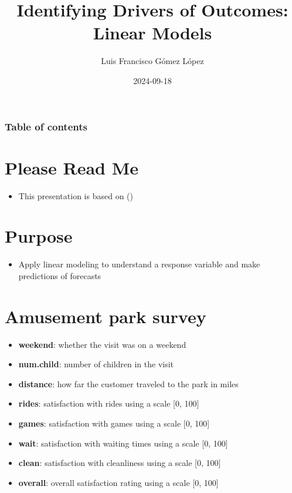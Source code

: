 \documentclass[
  ignorenonframetext,
]{beamer}
\title{Identifying Drivers of Outcomes: Linear Models}
\author{Luis Francisco Gómez López}
\date{2024-09-18}
\institute{FAEDIS}
\providecommand{\tightlist}{%
  \setlength{\itemsep}{0pt}\setlength{\parskip}{0pt}}\usepackage{longtable,booktabs,array}
\renewcommand*\contentsname{Table of contents}
\newcommand\contentsname{Table of contents}
\begin{document}
\frame{\titlepage}

\renewcommand*\contentsname{Table of contents}
\begin{frame}[allowframebreaks]
  \frametitle{Table of contents}
  \tableofcontents[hideallsubsections]
\end{frame}

\section{Please Read Me}\label{please-read-me}

\begin{frame}{}
\label{section}
\begin{itemize}
\tightlist
\item
  This presentation is based on ()
\end{itemize}
\end{frame}

\section{Purpose}\label{purpose}

\begin{frame}{}
\label{section-1}
\begin{itemize}
\tightlist
\item
  Apply linear modeling to understand a response variable and make
  predictions of forecasts
\end{itemize}
\end{frame}

\section{Amusement park survey}\label{amusement-park-survey}

\begin{frame}{}
\label{section-2}
\begin{itemize}
\tightlist
\item
  \textbf{weekend}: whether the visit was on a weekend
\item
  \textbf{num.child}: number of children in the visit
\item
  \textbf{distance}: how far the customer traveled to the park in miles
\item
  \textbf{rides}: satisfaction with rides using a scale {[}0, 100{]}
\item
  \textbf{games}: satisfaction with games using a scale {[}0, 100{]}
\item
  \textbf{wait}: satisfaction with waiting times using a scale {[}0,
  100{]}
\item
  \textbf{clean}: satisfaction with cleanliness using a scale {[}0,
  100{]}
\item
  \textbf{overall}: overall satisfaction rating using a scale {[}0,
  100{]}
\end{itemize}
\end{frame}
\end{document}
